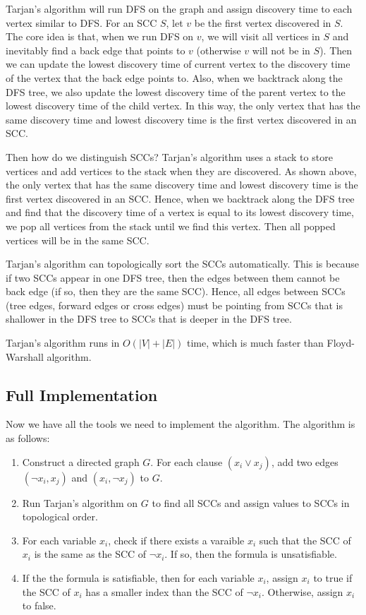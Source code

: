 \documentclass[a4paper,12pt]{article}
\begin{document}
\vspace{0.5cm}

Tarjan's algorithm will run DFS on the graph and assign discovery time to each vertex similar to DFS.
For an SCC $S$, let $v$ be the first vertex discovered in $S$.
The core idea is that, when we run DFS on $v$, we will visit all vertices in $S$ and inevitably find a back edge that points to $v$ (otherwise $v$ will not be in $S$).
Then we can update the lowest discovery time of current vertex to the discovery time of the vertex that the back edge points to.
Also, when we backtrack along the DFS tree, we also update the lowest discovery time of the parent vertex to the lowest discovery time of the child vertex.
In this way, the only vertex that has the same discovery time and lowest discovery time is the first vertex discovered in an SCC.

Then how do we distinguish SCCs?
Tarjan's algorithm uses a stack to store vertices and add vertices to the stack when they are discovered.
As shown above, the only vertex that has the same discovery time and lowest discovery time is the first vertex discovered in an SCC.
Hence, when we backtrack along the DFS tree and find that the discovery time of a vertex is equal to its lowest discovery time, we pop all vertices from the stack until we find this vertex.
Then all popped vertices will be in the same SCC.

Tarjan's algorithm can topologically sort the SCCs automatically.
This is because if two SCCs appear in one DFS tree, then the edges between them cannot be back edge (if so, then they are the same SCC).
Hence, all edges between SCCs (tree edges, forward edges or cross edges) must be pointing from SCCs that is shallower in the DFS tree to SCCs that is deeper in the DFS tree.

Tarjan's algorithm runs in $O(|V| + |E|)$ time, which is much faster than Floyd-Warshall algorithm.

\subsection{Full Implementation}

Now we have all the tools we need to implement the algorithm.
The algorithm is as follows:
\begin{enumerate}
	\item Construct a directed graph $G$.
		For each clause $(x_i \vee x_j)$, add two edges $(\neg x_i, x_j)$ and $(x_i, \neg x_j)$ to $G$.
	\item Run Tarjan's algorithm on $G$ to find all SCCs and assign values to SCCs in topological order.
	\item For each variable $x_i$, check if there exists a varaible $x_i$ such that the SCC of $x_i$ is the same as the SCC of $\neg x_i$.
		If so, then the formula is unsatisfiable.
	\item If the the formula is satisfiable, then for each variable $x_i$, assign $x_i$ to true if the SCC of $x_i$ has a smaller index than the SCC of $\neg x_i$.
		Otherwise, assign $x_i$ to false.
\end{enumerate}
\end{document}
